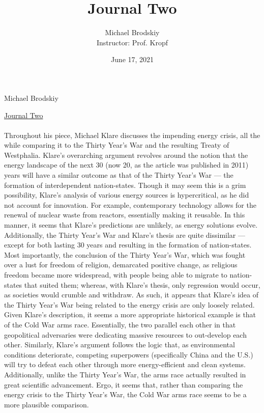 \documentclass[12pt]{article}
\title{Journal Two}
\date{June 17, 2021}
\author{Michael Brodskiy\\ \small Instructor: Prof. Kropf}
\begin{document}
\flushleft Michael Brodskiy

\begin{center}

 \underline{Journal Two}

\end{center}

\begin{justify}

  \paragraph{} Throughout his piece, Michael Klare discusses the impending energy crisis, all the while comparing it to the Thirty Year's War and the resulting Treaty of Westphalia. Klare's overarching argument revolves around the notion that the energy landscape of the next 30 (now 20, as the article was published in 2011) years will have a similar outcome as that of the Thirty Year's War — the formation of interdependent nation-states. Though it may seem this is a grim possibility, Klare's analysis of various energy sources is hypercritical, as he did not account for innovation. For example, contemporary technology allows for the renewal of nuclear waste from reactors, essentially making it reusable. In this manner, it seems that Klare's predictions are unlikely, as energy solutions evolve. Additionally, the Thirty Year's War and Klare's thesis are quite dissimilar — except for both lasting 30 years and resulting in the formation of nation-states. Most importantly, the conclusion of the Thirty Year's War, which was fought over a lust for freedom of religion, demarcated positive change, as religious freedom became more widespread, with people being able to migrate to nation-states that suited them; whereas, with Klare's thesis, only regression would occur, as societies would crumble and withdraw. As such, it appears that Klare's idea of the Thirty Year's War being related to the energy crisis are only loosely related.\\
  \indent Given Klare's description, it seems a more appropriate historical example is that of the Cold War arms race. Essentially, the two parallel each other in that geopolitical adversaries were dedicating massive resources to out-develop each other. Similarly, Klare's argument follows the logic that, as environmental conditions deteriorate, competing superpowers (specifically China and the U.S.) will try to defeat each other through more energy-efficient and clean systems. Additionally, unlike the Thirty Year's War, the arms race actually resulted in great scientific advancement. Ergo, it seems that, rather than comparing the energy crisis to the Thirty Year's War, the Cold War arms race seems to be a more plausible comparison.

\end{justify}
\end{document}

